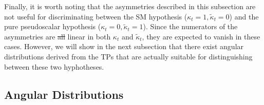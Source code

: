 \documentclass[aps,preprint,tightenlines,floatfix,superscriptaddress,nofootinbib,showpacs]{revtex4-1}
\def\kp{\kappa_t}
\def\kpt{\tilde{\kappa}_t}
\providecommand{\DIFdel}[1]{{\protect\color{red}\sout{#1}}}                      %
\providecommand{\DIFdelbegin}{} %
\providecommand{\DIFdelend}{} %
\begin{document}
\par Finally, it is worth noting that the asymmetries
described in this subsection are not useful for
discriminating between the SM hypothesis ($\kp=1,\kpt=0$) and the pure
pseudoscalar hypothesis ($\kp=0,\kpt=1$).  Since
the numerators of the 
asymmetries are \DIFdelbegin \DIFdel{all }\DIFdelend linear in both
$\kp$ and $\kpt$, they are expected to vanish in these cases. However, we
will show in the next subsection
that there exist angular distributions
derived from the TPs that are actually suitable for distinguishing between these
two hyphotheses.
\subsection{Angular Distributions}
\label{sec3.2}
\end{document}
